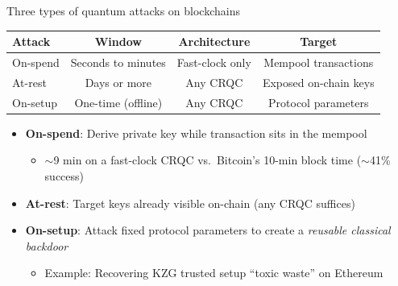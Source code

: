 \ifdefined\PRESENTATION\else\PassOptionsToClass{handout}{beamer}\fi\documentclass[aspectratio=169, lualatex]{beamer}
\begin{document}
\begin{frame}{Three types of quantum attacks on blockchains}
	\begin{center}
		\begin{tabular}{|l|c|c|c|}
			\hline
			\textbf{Attack} & \textbf{Window}    & \textbf{Architecture} & \textbf{Target}       \\
			\hline
			\hline
			On-spend        & Seconds to minutes & Fast-clock only       & Mempool transactions  \\
			\hline
			At-rest         & Days or more       & Any CRQC              & Exposed on-chain keys \\
			\hline
			On-setup        & One-time (offline) & Any CRQC              & Protocol parameters   \\
			\hline
		\end{tabular}
	\end{center}
	\begin{itemize}
		\item \textbf{On-spend}: Derive private key while transaction sits in the mempool
		      \begin{itemize}
			      \item $\sim$9 min on a fast-clock CRQC vs.\ Bitcoin's 10-min block time ($\sim$41\% success)
		      \end{itemize}
		\item \textbf{At-rest}: Target keys already visible on-chain (any CRQC suffices)
		\item \textbf{On-setup}: Attack fixed protocol parameters to create a \textit{reusable classical backdoor}
		      \begin{itemize}
			      \item Example: Recovering KZG trusted setup ``toxic waste'' on Ethereum
		      \end{itemize}
	\end{itemize}
\end{frame}
\end{document}
